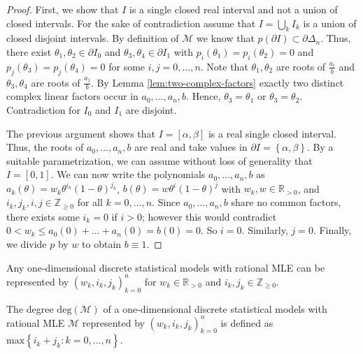 \begin{proof}
    First, we show that \( I \) is a single closed real interval and not a union of closed intervals. For the sake of contradiction assume that \( I = \bigcup_{k} I_k \) is a union of closed disjoint intervals. By definition of \( \mathcal{M} \) we know that \( p(\partial I) \subset \partial \Delta_n \). Thus, there exist \( \theta_1, \theta_2 \in \partial I_0 \) and \( \theta_3, \theta_4 \in \partial I_1 \) with \( p_i(\theta_1) = p_i(\theta_2) =  0 \) and \( p_j(\theta_3) = p_j(\theta_4) = 0 \) for some \( i,j = 0, \dots, n \). Note that \( \theta_1, \theta_2 \) are roots of \( \frac{a_i}{b} \) and  \( \theta_3, \theta_4 \) are roots of \( \frac{a_j}{b} \). By Lemma \ref{lem:two-complex-factors} exactly two distinct complex linear factors occur in \( a_0, \dots, a_n, b \). Hence, \( \theta_3 = \theta_1 \) or \( \theta_3 = \theta_2 \). Contradiction for \( I_0 \) and \( I_1 \) are disjoint.

    The previous argument shows that \( I = [\alpha, \beta ]\) is a real single closed interval. Thus, the roots of \( a_0, \dots, a_n, b \) are real and take values in \( \partial I = \left\{ \alpha, \beta \right\} \). By a suitable parametrization, we can assume without loss of generality that \( I = [0,1] \). We can now write the polynomials \( a_0, \dots, a_n, b \) as \(  a_k(\theta) = w_k \theta^{i_k} (1-\theta)^{j_k} \), \( b(\theta) = w \theta^{i} (1-\theta)^{j} \)
    with \( w_k, w \in \mathbb{R}_{>0} \), and \( i_k, j_k, i, j \in \mathbb{Z}_{\geq 0} \) for all \( k = 0, \dots, n \). Since \( a_0, \dots, a_n, b \) share no common factors, there exists some \( i_k = 0 \) if \( i > 0 \); however this would contradict \(0 < w_k \leq a_0(0) + \dots + a_n(0) = b(0) = 0\). So \( i = 0 \). Similarly, \( j = 0 \). Finally, we divide \( p \) by \( w \) to obtain \( b \equiv 1 \).
\end{proof}

\begin{corollary}
    Any one-dimensional {discrete} {statistical} {models} with rational MLE can be represented by \( (w_k, i_k, j_k)_{k=0}^n \) for \( w_k \in \mathbb{R}_{>0} \) and \( i_k, j_k \in \mathbb{Z}_{\geq 0} \).
\end{corollary}

\begin{definition}
    The degree \( \mathrm{deg}(\mathcal{M}) \) of a one-dimensional discrete statistical models with rational MLE \( \mathcal{M} \) represented by \( (w_k, i_k, j_k)_{k=0}^n \) is defined as \( \mathrm{max}\left\{ i_k + j_k : k = 0, \dots, n \right\} \).
\end{definition}


